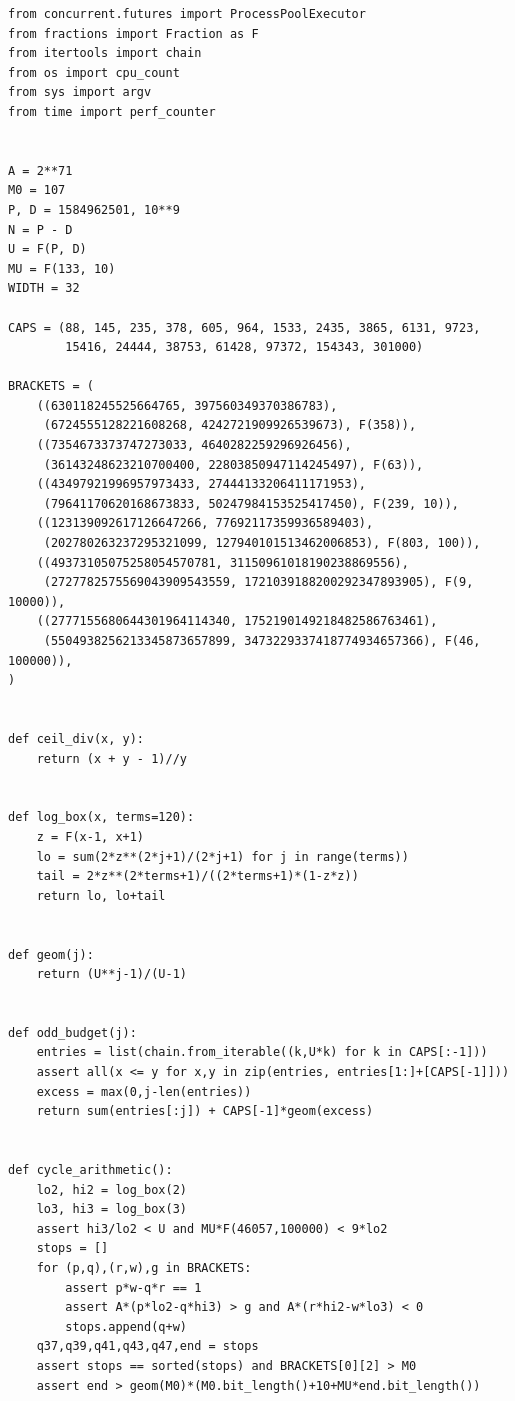 \documentclass[11pt]{article}
\theoremstyle{definition}
\begin{document}
\lstset{language=Python,basicstyle=\small\ttfamily,
  columns=fullflexible,keepspaces=true,showstringspaces=false,
  breaklines=true,aboveskip=0.7\baselineskip}
\begin{lstlisting}
from concurrent.futures import ProcessPoolExecutor
from fractions import Fraction as F
from itertools import chain
from os import cpu_count
from sys import argv
from time import perf_counter


A = 2**71
M0 = 107
P, D = 1584962501, 10**9
N = P - D
U = F(P, D)
MU = F(133, 10)
WIDTH = 32

CAPS = (88, 145, 235, 378, 605, 964, 1533, 2435, 3865, 6131, 9723,
        15416, 24444, 38753, 61428, 97372, 154343, 301000)

BRACKETS = (
    ((630118245525664765, 397560349370386783),
     (6724555128221608268, 4242721909926539673), F(358)),
    ((7354673373747273033, 4640282259296926456),
     (36143248623210700400, 22803850947114245497), F(63)),
    ((43497921996957973433, 27444133206411171953),
     (79641170620168673833, 50247984153525417450), F(239, 10)),
    ((123139092617126647266, 77692117359936589403),
     (202780263237295321099, 127940101513462006853), F(803, 100)),
    ((49373105075258054570781, 31150961018190238869556),
     (2727782575569043909543559, 1721039188200292347893905), F(9, 10000)),
    ((2777155680644301964114340, 1752190149218482586763461),
     (5504938256213345873657899, 3473229337418774934657366), F(46, 100000)),
)


def ceil_div(x, y):
    return (x + y - 1)//y


def log_box(x, terms=120):
    z = F(x-1, x+1)
    lo = sum(2*z**(2*j+1)/(2*j+1) for j in range(terms))
    tail = 2*z**(2*terms+1)/((2*terms+1)*(1-z*z))
    return lo, lo+tail


def geom(j):
    return (U**j-1)/(U-1)


def odd_budget(j):
    entries = list(chain.from_iterable((k,U*k) for k in CAPS[:-1]))
    assert all(x <= y for x,y in zip(entries, entries[1:]+[CAPS[-1]]))
    excess = max(0,j-len(entries))
    return sum(entries[:j]) + CAPS[-1]*geom(excess)


def cycle_arithmetic():
    lo2, hi2 = log_box(2)
    lo3, hi3 = log_box(3)
    assert hi3/lo2 < U and MU*F(46057,100000) < 9*lo2
    stops = []
    for (p,q),(r,w),g in BRACKETS:
        assert p*w-q*r == 1
        assert A*(p*lo2-q*hi3) > g and A*(r*hi2-w*lo3) < 0
        stops.append(q+w)
    q37,q39,q41,q43,q47,end = stops
    assert stops == sorted(stops) and BRACKETS[0][2] > M0
    assert end > geom(M0)*(M0.bit_length()+10+MU*end.bit_length())


\end{lstlisting}
\end{document}
